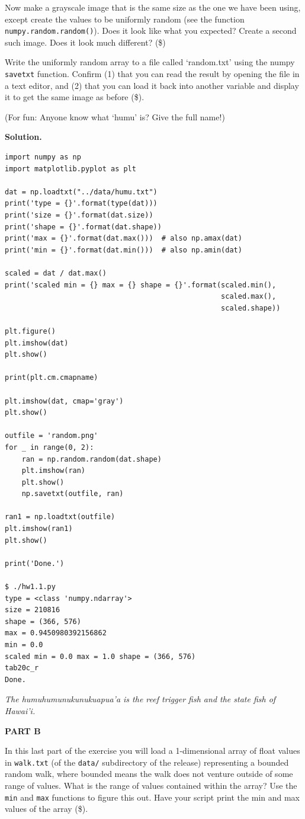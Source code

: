 \documentclass[10pt]{article}
\begin{document}
\begin{enumerate}
Now make a grayscale image that is the same size as the one we have been using, except create the values to be uniformly random (see the function {\tt numpy.random.random()}).  Does it look like what you expected?  Create a second such image.  Does it look much different? (\$)

Write the uniformly random array to a file called `random.txt' using the numpy {\tt savetxt} function.  Confirm (1) that you can read the result by opening the file in a text editor, and (2) that you can load it back into another variable and display it to get the same image as before (\$).

(For fun: Anyone know what `humu' is?  Give the full name!)

{\bf Solution.}

\begin{verbatim}
import numpy as np
import matplotlib.pyplot as plt

dat = np.loadtxt("../data/humu.txt")
print('type = {}'.format(type(dat)))
print('size = {}'.format(dat.size))
print('shape = {}'.format(dat.shape))
print('max = {}'.format(dat.max()))  # also np.amax(dat)
print('min = {}'.format(dat.min()))  # also np.amin(dat)

scaled = dat / dat.max()
print('scaled min = {} max = {} shape = {}'.format(scaled.min(),
                                                   scaled.max(),
                                                   scaled.shape))

plt.figure()
plt.imshow(dat)
plt.show()

print(plt.cm.cmapname)

plt.imshow(dat, cmap='gray')
plt.show()

outfile = 'random.png'
for _ in range(0, 2):
    ran = np.random.random(dat.shape)
    plt.imshow(ran)
    plt.show()
    np.savetxt(outfile, ran)

ran1 = np.loadtxt(outfile)
plt.imshow(ran1)
plt.show()

print('Done.')

$ ./hw1.1.py
type = <class 'numpy.ndarray'>
size = 210816
shape = (366, 576)
max = 0.9450980392156862
min = 0.0
scaled min = 0.0 max = 1.0 shape = (366, 576)
tab20c_r
Done.

\end{verbatim}

\emph{The humuhumunukunukuapua’a is the reef trigger fish and the state fish of Hawai'i.}

\textbf{PART B}

In this last part of the exercise you will load a 1-dimensional array of float values in {\tt walk.txt} (of the {\tt data/} subdirectory of the release) representing a bounded random walk, where bounded means the walk does not venture outside of some range of values.  What is the range of values contained within the array?  Use the {\tt min} and {\tt max} functions to figure this out.  Have your script print the min and max values of the array (\$).


\end{enumerate}
\end{document}
